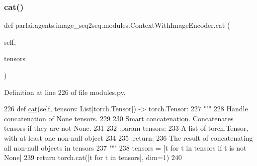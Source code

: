 \subsubsection{\texorpdfstring{cat()}{cat()}}
{\footnotesize\ttfamily def parlai.\+agents.\+image\+\_\+seq2seq.\+modules.\+Context\+With\+Image\+Encoder.\+cat (\begin{DoxyParamCaption}\item[{}]{self,  }\item[{}]{tensors }\end{DoxyParamCaption})}



Definition at line 226 of file modules.\+py.


\begin{DoxyCode}
226     \textcolor{keyword}{def }\hyperlink{namespaceparlai_1_1core_1_1build__data_adc4feba864e2a0d0663cdf6bf84afaf6}{cat}(self, tensors: List[torch.Tensor]) -> torch.Tensor:
227         \textcolor{stringliteral}{"""}
228 \textcolor{stringliteral}{        Handle concatenation of None tensors.}
229 \textcolor{stringliteral}{}
230 \textcolor{stringliteral}{        Smart concatenation. Concatenates tensors if they are not None.}
231 \textcolor{stringliteral}{}
232 \textcolor{stringliteral}{        :param tensors:}
233 \textcolor{stringliteral}{            A list of torch.Tensor, with at least one non-null object}
234 \textcolor{stringliteral}{}
235 \textcolor{stringliteral}{        :return:}
236 \textcolor{stringliteral}{            The result of concatenating all non-null objects in tensors}
237 \textcolor{stringliteral}{        """}
238         tensors = [t \textcolor{keywordflow}{for} t \textcolor{keywordflow}{in} tensors \textcolor{keywordflow}{if} t \textcolor{keywordflow}{is} \textcolor{keywordflow}{not} \textcolor{keywordtype}{None}]
239         \textcolor{keywordflow}{return} torch.cat([t \textcolor{keywordflow}{for} t \textcolor{keywordflow}{in} tensors], dim=1)
240 \end{DoxyCode}
\mbox{\label{classparlai_1_1agents_1_1image__seq2seq_1_1modules_1_1ContextWithImageEncoder_a4032d5006d44b81b5aee84d0730b5120}} 
